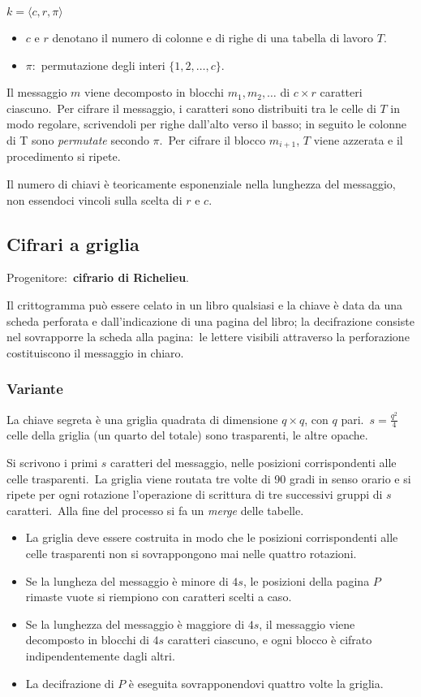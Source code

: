 $k = \langle c,r,\pi\rangle$
\begin{itemize}
    \item $c$ e $r$ denotano il numero di colonne e di righe di una tabella di lavoro $T$.\
    \item $\pi$:\ permutazione degli interi $\{1,2,\dots,c\}$.\
\end{itemize}

\noindent Il messaggio $m$ viene decomposto in blocchi $m_1,m_2,\dots$ di $c \times r$ caratteri ciascuno.\
Per cifrare il messaggio, i caratteri sono distribuiti tra le celle di $T$ in modo regolare, scrivendoli per righe dall'alto verso il basso; in seguito le colonne di T sono \textit{permutate} secondo $\pi$.\
Per cifrare il blocco $m_{i+1}$, $T$ viene azzerata e il procedimento si ripete.\

Il numero di chiavi è teoricamente esponenziale nella lunghezza del messaggio, non essendoci vincoli sulla scelta di $r$ e $c$.\

\subsection{Cifrari a griglia}

Progenitore:\ \textbf{cifrario di Richelieu}.\

Il crittogramma può essere celato in un libro qualsiasi e la chiave è data da una scheda perforata e dall'indicazione di una pagina del libro; la decifrazione consiste nel sovrapporre la scheda alla pagina:\ le lettere visibili attraverso la perforazione costituiscono il messaggio in chiaro.\

\subsubsection{Variante}

La chiave segreta è una griglia quadrata di dimensione $q \times q$, con $q$ pari.\
$s = \frac{q^2}{4}$ celle della griglia (un quarto del totale) sono trasparenti, le altre opache.\

Si scrivono i primi $s$ caratteri del messaggio, nelle posizioni corrispondenti alle celle trasparenti.\
La griglia viene routata tre volte di 90 gradi in senso orario e si ripete per ogni rotazione l'operazione di scrittura di tre successivi gruppi di $s$ caratteri.\
Alla fine del processo si fa un \textit{merge} delle tabelle.\

\begin{itemize}
    \item La griglia deve essere costruita in modo che le posizioni corrispondenti alle celle trasparenti non si sovrappongono mai nelle quattro rotazioni.\
    \item Se la lungheza del messaggio è minore di $4s$, le posizioni della pagina $P$ rimaste vuote si riempiono con caratteri scelti a caso.\
    \item Se la lunghezza del messaggio è maggiore di $4s$, il messaggio viene decomposto in blocchi di $4s$ caratteri ciascuno, e ogni blocco è cifrato indipendentemente dagli altri.
    \item La decifrazione di $P$ è eseguita sovrapponendovi quattro volte la griglia.
\end{itemize}


